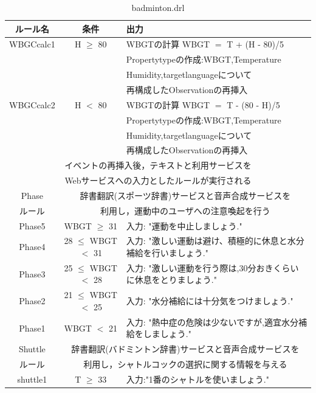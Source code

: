 \documentclass{kuisthesis}			%
\begin{document}
\begin{itemize}
\begin{table}[p]
  \begin{center}
    \caption{badminton.drl}
    \begin{tabularx}{\linewidth}{|c|c|X|} \hline
      ルール名 & 条件 & 出力 \\ \hline \hline
      WBGCcalc1 & H $\geq$ 80 & WBGTの計算 WBGT $=$ T + (H - 80)/5  \\
      & & Propertytypeの作成:WBGT,Temperature \\
      & & Humidity,targetlanguageについて \\ 
      & & 再構成したObservationの再挿入 \\ \hline
      WBGCcalc2 & H $<$  80 & WBGTの計算 WBGT $=$ T - (80 - H)/5  \\
      & & Propertytypeの作成:WBGT,Temperature \\
      & & Humidity,targetlanguageについて \\ 
      & & 再構成したObservationの再挿入 \\ \hline \hline
      \multicolumn{3}{|c|}{イベントの再挿入後，テキストと利用サービスを} \\
      \multicolumn{3}{|c|}{Webサービスへの入力としたルールが実行される} \\ \hline \hline
      Phase & \multicolumn{2}{c|}{辞書翻訳(スポーツ辞書)サービスと音声合成サービスを} \\
      ルール & \multicolumn{2}{c|}{利用し，運動中のユーザへの注意喚起を行う} \\ \hline \hline
      Phase5 & WBGT $\geq$ 31  & 入力: "運動を中止しましょう."\\ \hline
      Phase4 & 28 $\leq$ WBGT $<$ 31 & 入力: "激しい運動は避け、積極的に休息と水分補給を行いましょう."\\ \hline
      Phase3 & 25 $\leq$ WBGT $<$ 28 & 入力: "激しい運動を行う際は,30分おきくらいに休息をとりましょう."\\ \hline
      Phase2 & 21 $\leq$ WBGT $<$ 25 & 入力: "水分補給には十分気をつけましょう."\\ \hline
      Phase1 & WBGT $<$ 21 & 入力: "熱中症の危険は少ないですが,適宜水分補給をしましょう."\\ \hline \hline
      Shuttle & \multicolumn{2}{c|}{辞書翻訳(バドミントン辞書)サービスと音声合成サービスを} \\
      ルール & \multicolumn{2}{c|}{利用し，シャトルコックの選択に関する情報を与える} \\ \hline \hline
      shuttle1 & T $\geq$ 33 & 入力:"1番のシャトルを使いましょう." \\ \hline 

\end{tabularx}
\end{center}
\end{table}
\end{itemize}
\end{document}
